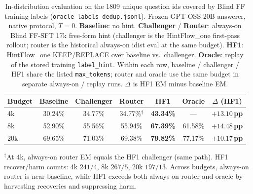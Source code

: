 \begin{table}[t]
\centering
\small
\setlength{\tabcolsep}{4pt}
\caption{In-distribution evaluation on the 1809 unique question ids covered by
Blind FF training labels (\texttt{oracle\_labels\_dedup.jsonl}).
Frozen GPT-OSS-20B answerer, native protocol, $T{=}0$.
\textbf{Baseline}: no hint.
\textbf{Challenger} / \textbf{Router}: always-on Blind FF-SFT 17k free-form hint
(challenger is the HintFlow\_one first-pass rollout; router is the historical
always-on idist eval at the same budget).
\textbf{HF1}: HintFlow\_one KEEP/REPLACE over baseline vs.\ challenger.
\textbf{Oracle}: replay of the stored training \texttt{label\_hint}.
Within each row, baseline / challenger / HF1 share the listed
\texttt{max\_tokens}; router and oracle use the same budget in separate
always-on / replay runs.
$\Delta$ is HF1 EM minus baseline EM.}
\label{tab:idist-1809-budgets}
\begin{tabular}{lcccccc}
\toprule
\textbf{Budget}
  & \textbf{Baseline}
  & \textbf{Challenger}
  & \textbf{Router}
  & \textbf{HF1}
  & \textbf{Oracle}
  & \textbf{$\Delta$ (HF1)} \\
\midrule
4k
  & 30.24\%
  & 34.77\%
  & 34.77\%$^{\dagger}$
  & \textbf{43.34\%}
  & ---
  & \textcolor{green!60!black}{\textbf{$+13.10$\,pp}} \\
8k
  & 52.90\%
  & 55.56\%
  & 55.94\%
  & \textbf{67.39\%}
  & 61.58\%
  & \textcolor{green!60!black}{\textbf{$+14.48$\,pp}} \\
20k
  & 69.65\%
  & 71.03\%
  & 69.38\%
  & \textbf{79.82\%}
  & 77.17\%
  & \textcolor{green!60!black}{\textbf{$+10.17$\,pp}} \\
\bottomrule
\end{tabular}

\vspace{0.25em}
{\scriptsize
$^{\dagger}$At 4k, always-on router EM equals the HF1 challenger (same path).
HF1 recover/harm counts: 4k $241/4$, 8k $267/5$, 20k $197/13$.
Across budgets, always-on router is near baseline, while HF1 exceeds both
always-on router and oracle by harvesting recoveries and suppressing harm.
}
\end{table}
